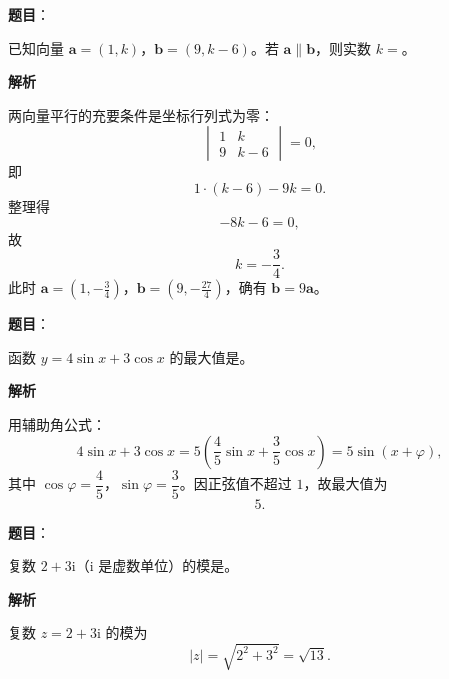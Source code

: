\begin{answer}

\textbf{题目}：

已知向量 $\boldsymbol a=(1,k)$，$\boldsymbol b=(9,k-6)$。若 $\boldsymbol a\parallel\boldsymbol b$，则实数 $k=$\gkblank{}。

\textbf{解析}

两向量平行的充要条件是坐标行列式为零：
\nopagebreak[4]
\[\begin{vmatrix}1&k\\9&k-6\end{vmatrix}=0,\]
即
\nopagebreak[4]
\[1\cdot(k-6)-9k=0.\]
整理得
\nopagebreak[4]
\[-8k-6=0,\]
故
\nopagebreak[4]
\[k=-\frac34.\]
此时 $\boldsymbol a=(1,-\tfrac34)$，$\boldsymbol b=(9,-\tfrac{27}4)$，确有 $\boldsymbol b=9\boldsymbol a$。


\end{answer}
\begin{answer}

\textbf{题目}：

函数 $y=4\sin x+3\cos x$ 的最大值是\gkblank{}。

\textbf{解析}

用辅助角公式：
\nopagebreak[4]
\[4\sin x+3\cos x=5\left(\frac45\sin x+\frac35\cos x\right)=5\sin(x+\varphi),\]
其中 $\cos\varphi=\dfrac45$，$\sin\varphi=\dfrac35$。因正弦值不超过 $1$，故最大值为
\nopagebreak[4]
\[5.\]


\end{answer}
\begin{answer}

\textbf{题目}：

复数 $2+3\mathrm i$（$\mathrm i$ 是虚数单位）的模是\gkblank{}。

\textbf{解析}

复数 $z=2+3\mathrm i$ 的模为
\nopagebreak[4]
\[|z|=\sqrt{2^2+3^2}=\sqrt{13}.\]


\end{answer}

